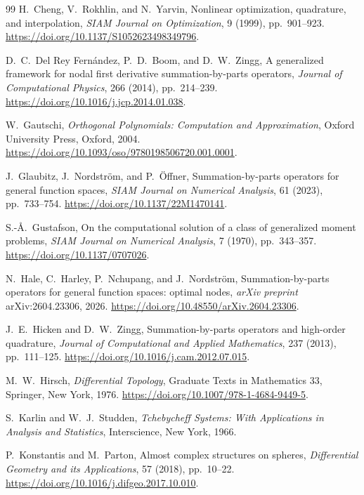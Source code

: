 \documentclass[11pt,a4paper]{article}
\theoremstyle{definition}
\theoremstyle{remark}
\begin{document}
\begin{thebibliography}{99}
H.~Cheng, V.~Rokhlin, and N.~Yarvin,
\newblock Nonlinear optimization, quadrature, and interpolation,
\newblock \emph{SIAM Journal on Optimization}, 9 (1999), pp.~901--923.
\newblock \url{https://doi.org/10.1137/S1052623498349796}.

D.~C.~Del Rey Fern\'andez, P.~D.~Boom, and D.~W.~Zingg,
\newblock A generalized framework for nodal first derivative summation-by-parts operators,
\newblock \emph{Journal of Computational Physics}, 266 (2014), pp.~214--239.
\newblock \url{https://doi.org/10.1016/j.jcp.2014.01.038}.

W.~Gautschi,
\newblock \emph{Orthogonal Polynomials: Computation and Approximation},
\newblock Oxford University Press, Oxford, 2004.
\newblock \url{https://doi.org/10.1093/oso/9780198506720.001.0001}.

J.~Glaubitz, J.~Nordstr\"om, and P.~\"Offner,
\newblock Summation-by-parts operators for general function spaces,
\newblock \emph{SIAM Journal on Numerical Analysis}, 61 (2023), pp.~733--754.
\newblock \url{https://doi.org/10.1137/22M1470141}.

S.-\AA.~Gustafson,
\newblock On the computational solution of a class of generalized moment problems,
\newblock \emph{SIAM Journal on Numerical Analysis}, 7 (1970), pp.~343--357.
\newblock \url{https://doi.org/10.1137/0707026}.

N.~Hale, C.~Harley, P.~Nchupang, and J.~Nordstr\"om,
\newblock Summation-by-parts operators for general function spaces: optimal nodes,
\newblock \emph{arXiv preprint} arXiv:2604.23306, 2026.
\newblock \url{https://doi.org/10.48550/arXiv.2604.23306}.

J.~E.~Hicken and D.~W.~Zingg,
\newblock Summation-by-parts operators and high-order quadrature,
\newblock \emph{Journal of Computational and Applied Mathematics}, 237 (2013), pp.~111--125.
\newblock \url{https://doi.org/10.1016/j.cam.2012.07.015}.

M.~W.~Hirsch,
\newblock \emph{Differential Topology},
\newblock Graduate Texts in Mathematics 33, Springer, New York, 1976.
\newblock \url{https://doi.org/10.1007/978-1-4684-9449-5}.

S.~Karlin and W.~J.~Studden,
\newblock \emph{Tchebycheff Systems: With Applications in Analysis and Statistics},
\newblock Interscience, New York, 1966.

P.~Konstantis and M.~Parton,
\newblock Almost complex structures on spheres,
\newblock \emph{Differential Geometry and its Applications}, 57 (2018), pp.~10--22.
\newblock \url{https://doi.org/10.1016/j.difgeo.2017.10.010}.


\end{thebibliography}
\end{document}
